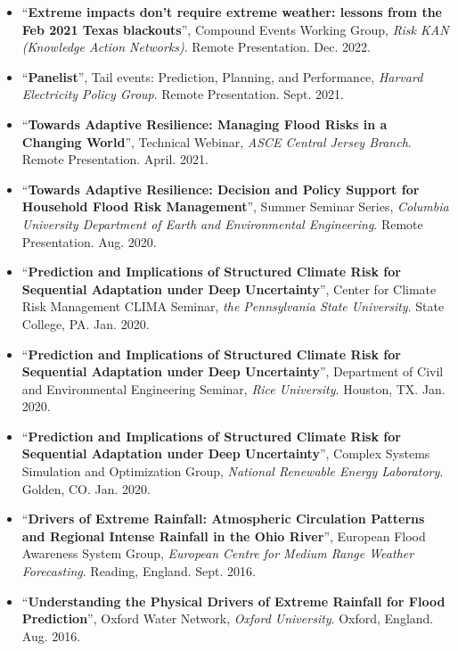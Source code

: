 \documentclass[10pt,oneside]{article}
\begin{document}
\begin{itemize}[label={}]
  
  \item \enquote{\textbf{Extreme impacts don’t require extreme weather: lessons from the Feb 2021 Texas blackouts}}, Compound Events Working Group,  \textit{Risk KAN (Knowledge Action Networks)}. Remote Presentation. Dec. 2022.
  
  \item \enquote{\textbf{Panelist}}, Tail events: Prediction, Planning, and Performance,  \textit{Harvard Electricity Policy Group}. Remote Presentation. Sept. 2021.
  
  \item \enquote{\textbf{Towards Adaptive Resilience: Managing Flood Risks in a Changing World}}, Technical Webinar,  \textit{ASCE Central Jersey Branch}. Remote Presentation. April. 2021.
  
  \item \enquote{\textbf{Towards Adaptive Resilience: Decision and Policy Support for Household Flood Risk Management}}, Summer Seminar Series,  \textit{Columbia University Department of Earth and Environmental Engineering}. Remote Presentation. Aug. 2020.
  
  \item \enquote{\textbf{Prediction and Implications of Structured Climate Risk for Sequential Adaptation under Deep Uncertainty}}, Center for Climate Risk Management CLIMA Seminar,  \textit{the Pennsylvania State University}. State College, PA. Jan. 2020.
  
  \item \enquote{\textbf{Prediction and Implications of Structured Climate Risk for Sequential Adaptation under Deep Uncertainty}}, Department of Civil and Environmental Engineering Seminar,  \textit{Rice University}. Houston, TX. Jan. 2020.
  
  \item \enquote{\textbf{Prediction and Implications of Structured Climate Risk for Sequential Adaptation under Deep Uncertainty}}, Complex Systems Simulation and Optimization Group,  \textit{National Renewable Energy Laboratory}. Golden, CO. Jan. 2020.
  
  \item \enquote{\textbf{Drivers of Extreme Rainfall: Atmospheric Circulation Patterns and Regional Intense Rainfall in the Ohio River}}, European Flood Awareness System Group,  \textit{European Centre for Medium Range Weather Forecasting}. Reading, England. Sept. 2016.
  
  \item \enquote{\textbf{Understanding the Physical Drivers of Extreme Rainfall for Flood Prediction}}, Oxford Water Network,  \textit{Oxford University}. Oxford, England. Aug. 2016.
  
\end{itemize}
\end{document}

